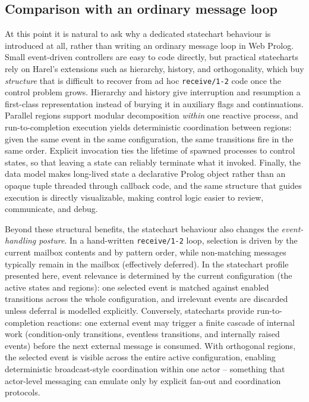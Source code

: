 \subsection{Comparison with an ordinary message loop}\label{sec:comparison-ordinary-look}

At this point it is natural to ask why a dedicated statechart behaviour is introduced at all, rather than writing an ordinary message loop in Web Prolog. Small event-driven controllers are easy to code directly, but practical statecharts rely on Harel's extensions such as hierarchy, history, and orthogonality, which buy \emph{structure} that is difficult to recover from ad hoc \texttt{receive/1-2} code once the control problem grows. Hierarchy and history give interruption and resumption a first-class representation instead of burying it in auxiliary flags and continuations. Parallel regions support modular decomposition \emph{within} one reactive process, and run-to-completion execution yields deterministic coordination between regions: given the same event in the same configuration, the same transitions fire in the same order. Explicit invocation ties the lifetime of spawned processes to control states, so that leaving a state can reliably terminate what it invoked. Finally, the data model makes long-lived state a declarative Prolog object rather than an opaque tuple threaded through callback code, and the same structure that guides execution is directly visualizable, making control logic easier to review, communicate, and debug.

Beyond these structural benefits, the statechart behaviour also changes the \emph{event-handling posture}. In a hand-written \texttt{receive/1-2} loop, selection is driven by the current mailbox contents and by pattern order, while non-matching messages typically remain in the mailbox (effectively deferred). In the statechart profile presented here, event relevance is determined by the current configuration (the active states and regions): one selected event is matched against enabled transitions across the whole configuration, and irrelevant events are discarded unless deferral is modelled explicitly. Conversely, statecharts provide run-to-completion reactions: one external event may trigger a finite cascade of internal work (condition-only transitions, eventless transitions, and internally raised events) before the next external message is consumed. With orthogonal regions, the selected event is visible across the entire active configuration, enabling deterministic broadcast-style coordination within one actor -- something that actor-level messaging can emulate only by explicit fan-out and coordination protocols.

